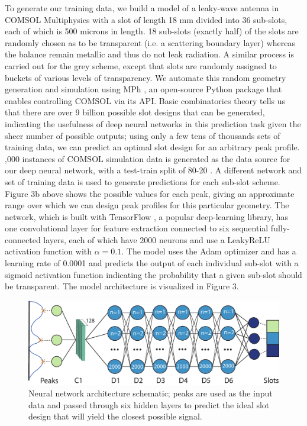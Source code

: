 \documentclass[11pt]{article}
\begin{document}
\noindent To generate our training data, we build a model of a leaky-wave antenna in COMSOL Multiphysics with a slot of length 18 mm divided into 36 sub-slots, each of which is 500 microns in length. 18 sub-slots (exactly half) of the slots are randomly chosen as to be transparent (i.e. a scattering boundary layer) whereas the balance remain metallic and thus do not leak radiation. A similar process is carried out for the grey scheme, except that slots are randomly assigned to buckets of various levels of transparency. We automate this random geometry generation and simulation using MPh \cite{john_hennig_2022_6312347}, an open-source Python package that enables controlling COMSOL via its API. Basic combinatorics theory tells us that there are over 9 billion possible slot designs that can be generated, indicating the usefulness of deep neural networks in this prediction task given the sheer number of possible outputs; using only a few tens of thousands sets of training data, we can predict an optimal slot design for an arbitrary peak profile. \\

,000 instances of COMSOL simulation data is generated as the data source for our deep neural network, with a test-train split of 80-20 \cite{molecules26041111}. A different network and set of training data is used to generate predictions for each sub-slot scheme. Figure 3b above shows the possible values for each peak, giving an approximate range over which we can design peak profiles for this particular geometry. The network, which is built with TensorFlow \cite{tensorflow2015-whitepaper}, a popular deep-learning library, has one convolutional layer for feature extraction connected to six sequential fully-connected layers, each of which have 2000 neurons and use a LeakyReLU activation function with $\alpha = 0.1$. The model uses the Adam optimizer and has a learning rate of 0.0001 and predicts the output of each individual sub-slot with a sigmoid activation function indicating the probability that a given sub-slot should be transparent. The model architecture is visualized in Figure 3. \\

\begin{figure}[H]
	\centering
	\includegraphics[width=6in]{figures/fig1pdf}
	\caption{Neural network architecture schematic; peaks are used as the input data and passed through six hidden layers to predict the ideal slot design that will yield the closest possible signal.}
\end{figure}
\end{document}
